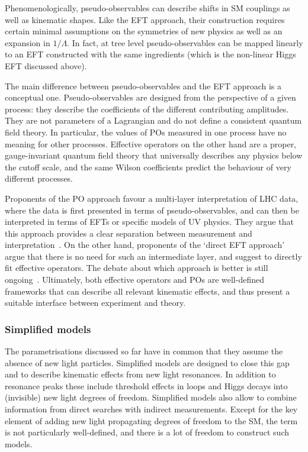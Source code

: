 Phenomenologically, pseudo-observables can describe shifts in SM
couplings as well as kinematic shapes. Like the EFT approach, their
construction requires certain minimal assumptions on the symmetries of
new physics as well as an expansion in $1/\Lambda$. In fact, at tree
level pseudo-observables can be mapped linearly to an EFT constructed
with the same ingredients (which is the non-linear Higgs EFT discussed
above).

The main difference between pseudo-observables and the EFT approach is
a conceptual one. Pseudo-observables are designed from the perspective
of a given process: they describe the coefficients of the different
contributing amplitudes. They are not parameters of a Lagrangian and
do not define a consistent quantum field theory. In particular, the
values of POs measured in one process have no meaning for other
processes. Effective operators on the other hand are a proper,
gauge-invariant quantum field theory that universally describes any
physics below the cutoff scale, and the same Wilson coefficients
predict the behaviour of very different processes.

Proponents of the PO approach favour a multi-layer interpretation of
LHC data, where the data is first presented in terms of
pseudo-observables, and can then be interpreted in terms of EFTs or
specific models of UV physics. They argue that this approach provides
a clear separation between measurement and
interpretation~\cite{deFlorian:2016spz}. On the other hand, proponents
of the `direct EFT approach' argue that there is no need for such an
intermediate layer, and suggest to directly fit effective
operators. The debate about which approach is better is still
ongoing~\cite{deFlorian:2016spz}. Ultimately, both effective operators
and POs are well-defined frameworks that can describe all relevant
kinematic effects, and thus present a suitable interface between
experiment and theory.



\subsubsection{Simplified models}

The parametrisations discussed so far have in common that they assume
the absence of new light particles. Simplified models are designed to
close this gap and to describe kinematic effects from new light
resonances. In addition to resonance peaks these include threshold
effects in loops and Higgs decays into (invisible) new light degrees
of freedom. Simplified models also allow to combine information from
direct searches with indirect measurements. Except for the key element
of adding new light propagating degrees of freedom to the SM, the term
is not particularly well-defined, and there is a lot of freedom to
construct such models.

